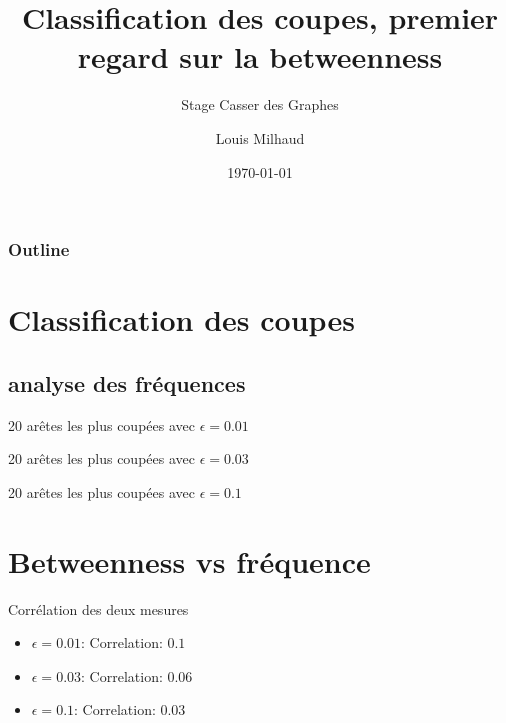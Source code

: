 \documentclass[aspectratio=169]{beamer}
\title{Classification des coupes, premier regard sur la betweenness}
\subtitle{Stage Casser des Graphes}
\author{Louis Milhaud}
\institute{Complex Networks - LIP6}
\date{\today}
\begin{document}
    \begin{frame}
        \titlepage
    \end{frame}

    \begin{frame}
        \frametitle{Outline}
        \tableofcontents
    \end{frame}

    \section{Classification des coupes}

    \subsection{analyse des fréquences}
    \begin{frame}{20 arêtes les plus coupées avec $\epsilon = 0.01$}
        
    \end{frame}

    \begin{frame}{20 arêtes les plus coupées avec $\epsilon = 0.03$}
        
    \end{frame}

    \begin{frame}{20 arêtes les plus coupées avec $\epsilon = 0.1$}
        
    \end{frame}
    \section{Betweenness vs fréquence}

    \begin{frame}{Corrélation des deux mesures}
    \begin{itemize}
        \item $\epsilon = 0.01$: Correlation: $0.1$
        \item $\epsilon = 0.03$: Correlation: $0.06$
        \item $\epsilon = 0.1$:  Correlation: $0.03$
    \end{itemize}
    \end{frame}
\end{document}
